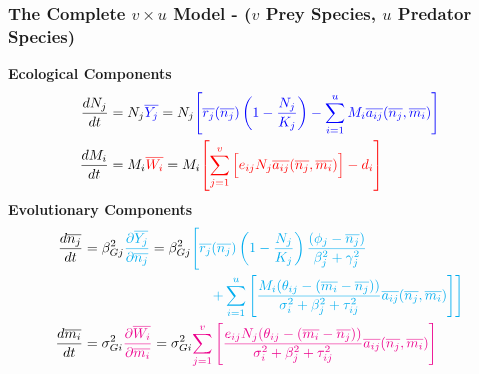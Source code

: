 \documentclass[10pt]{beamer}
\begin{document}
\begin{frame}
	\frametitle{The Complete $v\times u$ Model - \normalsize($v$ Prey Species, $u$ Predator Species)}
	{\bf Ecological Components}
	\begin{align*}
		\frac{dN_j}{dt} &= N_j{\color{blue}\overline{Y_j}} = N_j {\color{blue}\left[{\color{blue}\overline{r_j}(\overline{n_j})\left(1 - \frac{N_j}{K_j}\right) - \sum\limits_{i = 1}^{u}M_i\overline{a_{ij}}(\overline{n_j}, \overline{m_i})}\right]} \\
		\frac{dM_i}{dt} &= M_i{\color{red}\overline{W_i}} = M_i {\color{red}\left[\sum\limits_{j = 1}^{v}\Big[e_{ij}N_j\overline{a_{ij}}(\overline{n_j}, \overline{m_i})\Big] - d_i\right]}
	\end{align*}
	{\bf Evolutionary Components}
	\begin{align*}
		\frac{d\overline{n_j}}{dt} &= \beta_{Gj}^2{\color{cyan}\frac{\partial \overline{Y_j}}{\partial \overline{n_j}}} = \beta_{Gj}^2{\color{cyan}\left[\overline{r_j}(\overline{n_j})\left(1 - \frac{N_j}{K_j}\right)\frac{(\phi_j - \overline{n_j})}{\beta_j^2 + \gamma_j^2}\right.}
		\\&\hphantom{\text{mmmmmmmmmmm}}{\left.\color{cyan}+ \sum\limits_{i=1}^{u}\left[\frac{M_i(\theta_{ij} - (\overline{m_i} - \overline{n_j}))}{\sigma_i^2 + \beta_j^2 + \tau_{ij}^2} \overline{a_{ij}}(\overline{n_j}, \overline{m_i})\right]\right]}\\
		\frac{d\overline{m_i}}{dt} &= \sigma_{Gi}^2{\color{magenta}\frac{\partial\overline{W_i}}{\partial\overline{m_i}}} = \sigma_{Gi}^2{\color{magenta}\sum\limits_{j=1}^{v}\left[\frac{e_{ij}N_j(\theta_{ij} - (\overline{m_i} - \overline{n_j}))}{\sigma_i^2 + \beta_j^2 + \tau_{ij}^2} \overline{a_{ij}}(\overline{n_j}, \overline{m_i})\right]}
	\end{align*}
\end{frame}
\end{document}
